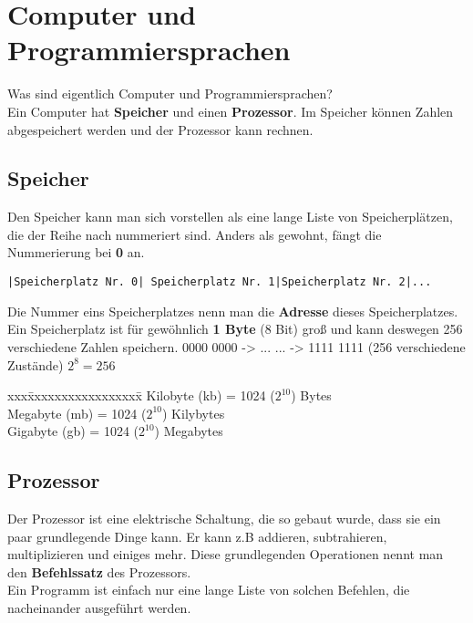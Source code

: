\documentclass[c_worksheet.tex]{subfiles}
\begin{document}
\chapter{Computer und Programmiersprachen}

Was sind eigentlich Computer und Programmiersprachen? \\
Ein Computer hat \textbf{Speicher} und einen \textbf{Prozessor}. Im Speicher können Zahlen abgespeichert werden und der Prozessor kann rechnen. \\

\section{Speicher}

Den Speicher kann man sich vorstellen als eine lange Liste von Speicherplätzen, die der Reihe nach nummeriert sind. Anders als gewohnt, fängt die Nummerierung bei \textbf{0} an. \\

\begin{lstlisting}[numbers=none, backgroundcolor=\color{lightgray}, frame=lrtb]
|Speicherplatz Nr. 0| Speicherplatz Nr. 1|Speicherplatz Nr. 2|...
\end{lstlisting}

\vspace{3pt}
Die Nummer eins Speicherplatzes nenn man die \textbf{Adresse} dieses Speicherplatzes. \\
Ein Speicherplatz ist für gewöhnlich \textbf{1 Byte} (8 Bit) groß und kann deswegen 256 verschiedene Zahlen speichern.
0000 0000 -> ...  ... -> 1111 1111 (256 verschiedene Zustände) $2^8 = 256$ \\

\begin{tabbing}
xxx\=xxxxxxxxxxxxxxxxx\=  \kill
{} Kilobyte (kb) \>= 1024 ($2^{10}$) Bytes\\
 Megabyte (mb) \>= 1024 ($2^{10}$) Kilybytes\\
 Gigabyte (gb) \>= 1024 ($2^{10}$) Megabytes\\
\end{tabbing}

\newpage
\section{Prozessor}

Der Prozessor ist eine elektrische Schaltung, die so gebaut wurde, dass sie ein paar grundlegende Dinge kann.
Er kann z.B addieren, subtrahieren, multiplizieren und einiges mehr. Diese grundlegenden Operationen nennt man den \textbf{Befehlssatz} des Prozessors.\\
Ein Programm ist einfach nur eine lange Liste von solchen Befehlen, die nacheinander ausgeführt werden. \\
\end{document}
